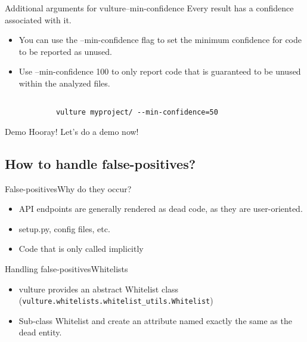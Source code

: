 \documentclass{beamer}
\begin{document}
\begin{frame}{Additional arguments for vulture}{--min-confidence}
    Every result has a confidence associated with it.
    \begin{itemize}
        \item
            You can use the --min-confidence flag to set the minimum confidence for code to be reported as unused.
        \item
            Use --min-confidence 100 to only report code that is \alert{guaranteed} to be unused within the analyzed files.
    \end{itemize}
    
    \begin{example}
        \begin{verbatim}

            vulture myproject/ --min-confidence=50

        \end{verbatim}
    \end{example}
\end{frame}

\begin{frame}{Demo}
    \alert{Hooray! Let's do a demo now!}
    
\end{frame}

\subsection{How to handle false-positives?}

\begin{frame}{False-positives}{Why do they occur?}
    \begin{itemize}
        \item
            API endpoints are generally rendered as dead code, as they are user-oriented.
        \pause
        \item
            setup.py, config files, etc.
        \pause
        \item
            Code that is only called implicitly
    \end{itemize}
\end{frame}

\begin{frame}{Handling false-positives}{Whitelists}
    \begin{itemize}
        \item
            vulture provides an abstract Whitelist class (\texttt{vulture.whitelists.whitelist\_utils.Whitelist})
        \item
            Sub-class \alert{Whitelist} and create an attribute named exactly the same as the dead entity.
    \end{itemize}
\end{frame}
\end{document}
